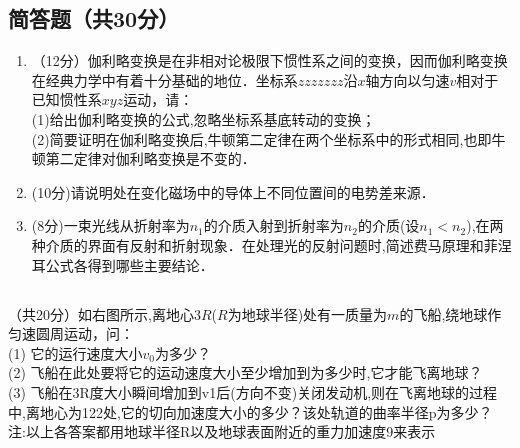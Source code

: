 \subsection{简答题（共30分）}
\begin{enumerate}
\item （12分）伽利略变换是在非相对论极限下惯性系之间的变换，因而伽利略变换在经典力学中有着十分基础的地位．坐标系$zzzzzzz$沿$x$轴方向以匀速$v$相对于已知惯性系$xyz$运动，请：\\
(1)给出伽利略变换的公式,忽略坐标系基底转动的变换；\\
(2)简要证明在伽利略变换后,牛顿第二定律在两个坐标系中的形式相同,也即牛顿第二定律对伽利略变换是不变的．\\

\item (10分)请说明处在变化磁场中的导体上不同位置间的电势差来源．

\item (8分)一束光线从折射率为$n_{1}$的介质入射到折射率为$n_{2}$的介质(设$n_{1}<n_{2}$),在两种介质的界面有反射和折射现象．在处理光的反射问题时,简述费马原理和菲涅耳公式各得到哪些主要结论．
\end{enumerate}
\subsection{ }
（共20分）如右图所示,离地心$3R$($R$为地球半径)处有一质量为$m$的飞船,绕地球作匀速圆周运动，问：\\
(1) 它的运行速度大小$v_{0}$为多少？\\
(2) 飞船在此处要将它的运动速度大小至少增加到为多少时,它才能飞离地球？\\
(3) 飞船在3R度大小瞬间增加到v1后(方向不变)关闭发动机,则在飞离地球的过程中,离地心为122处,它的切向加速度大小的多少？该处轨道的曲率半径p为多少？\\
注:以上各答案都用地球半径R以及地球表面附近的重力加速度9来表示